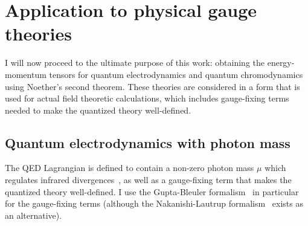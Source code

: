 \documentclass[prd,preprint,
  showpacs,showkeys,lengthcheck,
  nofootinbib,tightenlines,onecolumn,notitlepage,
  preprintnumbers,superscriptaddress]{revtex4-1}
\begin{document}
\section{Application to physical gauge theories}
\label{sec:gauge}

I will now proceed to the ultimate purpose of this work:
obtaining the energy-momentum tensors for
quantum electrodynamics and quantum chromodynamics
using Noether's second theorem.
These theories are considered in a form that is used for actual field theoretic
calculations, which includes gauge-fixing terms needed to make the quantized
theory well-defined.



\subsection{Quantum electrodynamics with photon mass}

The QED Lagrangian is defined to contain a non-zero photon mass $\mu$
which regulates infrared divergences~\cite{Proca:1936fbw,Stueckelberg:1938hvi},
as well as a gauge-fixing term that makes the quantized theory
well-defined.
I use the Gupta-Bleuler
formalism~\cite{Gupta:1949rh,Bleuler:1950cy}
in particular for the gauge-fixing terms
(although the Nakanishi-Lautrup
formalism~\cite{Lautrup:1967zz,Nakanishi:1977gt,Nakanishi:1978zx,Nakanishi:1978np}
exists as an alternative).
\end{document}

